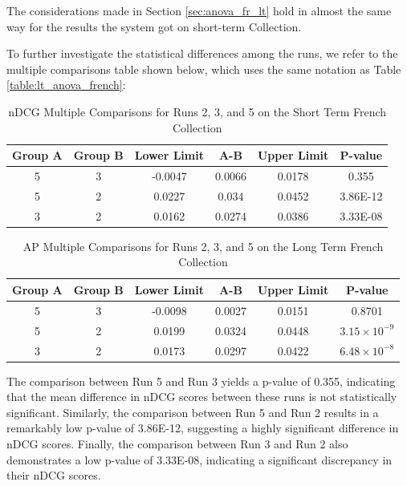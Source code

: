 The considerations made in Section \ref{sec:anova_fr_lt} hold in almost the same way for the results the system got on short-term Collection.  

To further investigate the statistical differences among the runs, we refer to the multiple comparisons table shown below, which uses the same notation as Table \ref{table:lt_anova_french}:

\begin{table}[!h]
    \centering
    \caption{\ac{nDCG} Multiple Comparisons for Runs 2, 3, and 5 on the Short Term French Collection}
    \label{table:st_anova_french}
    \begin{tabular}{cccccc}
    \hline
    Group A & Group B & Lower Limit & A-B & Upper Limit & P-value \\ \hline
    5 & 3 & -0.0047 & 0.0066 & 0.0178 & 0.355 \\
    5 & 2 & 0.0227 & 0.034 & 0.0452 & 3.86E-12 \\
    3 & 2 & 0.0162 & 0.0274 & 0.0386 & 3.33E-08 \\ \hline
    \end{tabular}
\end{table}

\begin{table}[!h]
    \centering
    \caption{\ac{AP} Multiple Comparisons for Runs 2, 3, and 5 on the Long Term French Collection}
    \label{table:st_anova_french_ap}
    \begin{tabular}{cccccc}
    \hline
    Group A & Group B & Lower Limit & A-B & Upper Limit & P-value \\ \hline
    5 & 3 & -0.0098 & 0.0027 & 0.0151 & 0.8701 \\
    5 & 2 & 0.0199 & 0.0324 & 0.0448 & $3.15 \times 10^{-9}$ \\
    3 & 2 & 0.0173 & 0.0297 & 0.0422 & $6.48 \times 10^{-8}$ \\ \hline
    \end{tabular}
\end{table}
 
The comparison between Run 5 and Run 3 yields a p-value of 0.355, indicating that the mean difference in \ac{nDCG} scores between these runs is not statistically significant. 
Similarly, the comparison between Run 5 and Run 2 results in a remarkably low p-value of 3.86E-12, suggesting a highly significant difference in \ac{nDCG} scores. 
Finally, the comparison between Run 3 and Run 2 also demonstrates a low p-value of 3.33E-08, indicating a significant discrepancy in their \ac{nDCG} scores.


